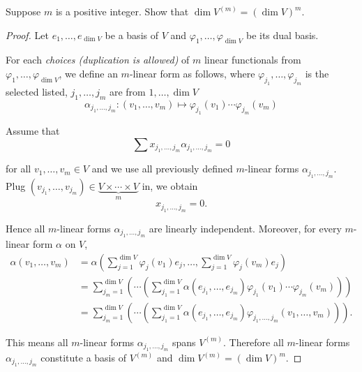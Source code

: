 \begin{exercise}\label{chapter9:sectionB:exercise1}
    Suppose $m$ is a positive integer. Show that $\dim V^{(m)} = {(\dim V)}^{m}$.
\end{exercise}

\begin{proof}
    Let $e_{1}, \ldots, e_{\dim V}$ be a basis of $V$ and $\varphi_{1}, \ldots, \varphi_{\dim V}$ be its dual basis.

    For each \textit{choices (duplication is allowed)}  of $m$ linear functionals from $\varphi_{1}, \ldots, \varphi_{\dim V}$, we define an $m$-linear form as follows, where $\varphi_{j_{1}}, \ldots, \varphi_{j_{m}}$ is the selected listed, $j_{1}, \ldots, j_{m}$ are from $1, \ldots, \dim V$
    \[
        \alpha_{j_{1},\ldots,j_{m}}: (v_{1}, \ldots, v_{m})\mapsto \varphi_{j_{1}}(v_{1})\cdots \varphi_{j_{m}}(v_{m})
    \]

    Assume that
    \[
        \sum x_{j_{1},\ldots,j_{m}}\alpha_{j_{1},\ldots,j_{m}} = 0
    \]

    for all $v_{1}, \ldots, v_{m}\in V$ and we use all previously defined $m$-linear forms $\alpha_{j_{1},\ldots,j_{m}}$. Plug $(v_{j_{1}}, \ldots, v_{j_{m}})\in \underbrace{V\times\cdots\times V}_{m}$ in, we obtain
    \[
        x_{j_{1},\ldots, j_{m}} = 0.
    \]

    Hence all $m$-linear forms $\alpha_{j_{1},\ldots,j_{m}}$ are linearly independent. Moreover, for every $m$-linear form $\alpha$ on $V$,
    \begin{align*}
        \alpha(v_{1}, \ldots, v_{m}) & = \alpha\left(\sum^{\dim V}_{j=1}\varphi_{j}(v_{1})e_{j}, \ldots, \sum^{\dim V}_{j=1}\varphi_{j}(v_{m})e_{j}\right)                                                     \\
                                     & = \sum^{\dim V}_{j_{m}=1}\left(\cdots\left(\sum^{\dim V}_{j_{1}=1}\alpha(e_{j_{1}}, \ldots, e_{j_{m}})\varphi_{j_{1}}(v_{1})\cdots\varphi_{j_{m}}(v_{m})\right)\right)  \\
                                     & = \sum^{\dim V}_{j_{m}=1}\left(\cdots\left(\sum^{\dim V}_{j_{1}=1}\alpha(e_{j_{1}}, \ldots, e_{j_{m}})\varphi_{j_{1},\ldots,j_{m}}(v_{1}, \ldots, v_{m})\right)\right).
    \end{align*}

    This means all $m$-linear forms $\alpha_{j_{1},\ldots,j_{m}}$ spans $V^{(m)}$. Therefore all $m$-linear forms $\alpha_{j_{1},\ldots,j_{m}}$ constitute a basis of $V^{(m)}$ and $\dim V^{(m)} = {(\dim V)}^{m}$.
\end{proof}
\newpage

